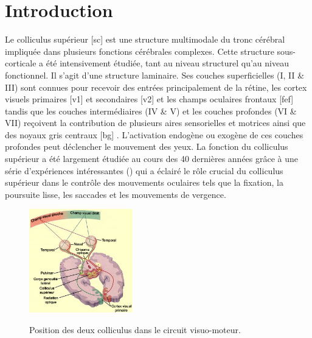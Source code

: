 \DontNumberThisInToc
\DontFrameThisInToc
\glsresetall
{}

\section{Introduction}

Le colliculus supérieur [\gls{sc}] est une structure multimodale du tronc cérébral impliquée dans plusieurs fonctions cérébrales complexes. Cette structure sous-corticale a été intensivement étudiée, tant au niveau structurel qu'au niveau fonctionnel. Il s'agit d'une structure laminaire. Ses couches superficielles (I, II \& III) sont connues pour recevoir des entrées principalement de la rétine, les cortex visuels primaires [\gls{v1}] et secondaires [\gls{v2}] et les champs oculaires frontaux [\gls{fef}] tandis que les couches intermédiaires (IV \& V) et les couches profondes (VI \& VII) reçoivent la contribution de plusieurs aires sensorielles et motrices ainsi que des noyaux gris centraux [\gls{bg}] \cite{May:2006,McHaffie:2005}. L'activation endogène ou exogène de ces couches profondes peut déclencher le mouvement des yeux. La fonction du colliculus supérieur a été largement étudiée au cours des 40 dernières années grâce à une série d'expériences intéressantes (\cite{Levy-Schoen:1969, Robinson:1972, Sparks:1976, Sparks:1980, Lee:1988, Munoz:1995a, Anderson:1998, Badler:2002}) qui a éclairé le rôle crucial du colliculus supérieur dans le contrôle des mouvements oculaires tels que la fixation, la poursuite lisse, les saccades et les mouvements de vergence.\\

\begin{figure}[htbp!]
  \centering
    \includegraphics[width=0.4\textwidth]{figures/ch3_1_colliculus}\\

  \caption{ Position des deux colliculus dans le circuit visuo-moteur.}
  \label{fig: coll}
\end{figure}

